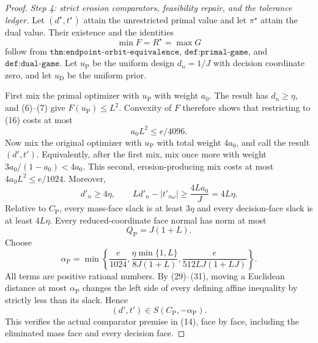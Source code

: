 \documentclass{article}
\begin{document}
\begin{proof}
\emph{Step 4: strict erosion comparators, feasibility repair, and the tolerance ledger.}
Let \((d^\star,t^\star)\) attain the unrestricted primal value and let \(\pi^\star\) attain the dual value.  Their existence and the identities
\[
 \min F=R^\star=\max G
\tag{27}
\]
follow from \(\texttt{thm:endpoint-orbit-equivalence}\), \(\texttt{def:primal-game}\), and \(\texttt{def:dual-game}\).  Let \(u_{\mathrm P}\) be the uniform design \(d_n=1/J\) with decision coordinate zero, and let \(u_{\mathrm D}\) be the uniform prior.

First mix the primal optimizer with \(u_{\mathrm P}\) with weight \(a_0\).  The result has \(d_n\ge\eta\), and (6)--(7) give \(F(u_{\mathrm P})\le L^2\).  Convexity of \(F\) therefore shows that restricting to (16) costs at most
\[
 a_0L^2\le e/4096.
\tag{28}
\]
Now mix the original optimizer with \(u_{\mathrm P}\) with total weight \(4a_0\), and call the result \((d',t')\).  Equivalently, after the first mix, mix once more with weight \(3a_0/(1-a_0)<4a_0\).  This second, erosion-producing mix costs at most \(4a_0L^2\le e/1024\).  Moreover,
\[
 d'_n\ge4\eta,
 \qquad
 Ld'_n-|t'_{n\omega}|\ge \frac{4La_0}{J}=4L\eta.
\tag{29}
\]
Relative to \(C_{\mathrm P}\), every mass-face slack is at least \(3\eta\) and every decision-face slack is at least \(4L\eta\).  Every reduced-coordinate face normal has norm at most
\[
 Q_{\mathrm P}=J(1+L).
\tag{30}
\]
Choose
\[
 \alpha_{\mathrm P}=\min\left\{
   \frac e{1024},
   \frac{\eta\min\{1,L\}}{8J(1+L)},
   \frac e{512LJ(1+LJ)}
 \right\}.
\tag{31}
\]
All terms are positive rational numbers.  By (29)--(31), moving a Euclidean distance at most \(\alpha_{\mathrm P}\) changes the left side of every defining affine inequality by strictly less than its slack.  Hence
\[
 (d',t')\in S(C_{\mathrm P},-\alpha_{\mathrm P}).
\tag{32}
\]
This verifies the actual comparator premise in (14), face by face, including the eliminated mass face and every decision face.


\end{proof}
\end{document}
